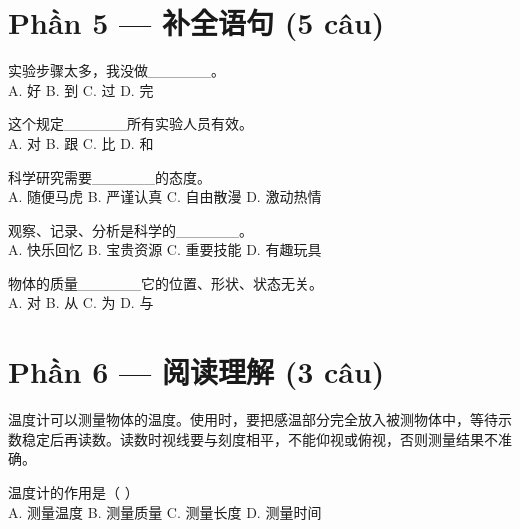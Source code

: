 \documentclass[11pt, a4paper]{article}
\begin{document}
\section*{Phần 5 — 补全语句 (5 câu)}

\begin{baitap}[13]
实验步骤太多，我没做\_\_\_\_\_\_。\\[4pt]
A. 好 \quad B. 到 \quad C. 过 \quad D. 完
\end{baitap}

\begin{baitap}[14]
这个规定\_\_\_\_\_\_所有实验人员有效。\\[4pt]
A. 对 \quad B. 跟 \quad C. 比 \quad D. 和
\end{baitap}

\begin{baitap}[15]
科学研究需要\_\_\_\_\_\_的态度。\\[4pt]
A. 随便马虎 \quad B. 严谨认真 \quad C. 自由散漫 \quad D. 激动热情
\end{baitap}

\begin{baitap}[16]
观察、记录、分析是科学的\_\_\_\_\_\_。\\[4pt]
A. 快乐回忆 \quad B. 宝贵资源 \quad C. 重要技能 \quad D. 有趣玩具
\end{baitap}

\begin{baitap}[17]
物体的质量\_\_\_\_\_\_它的位置、形状、状态无关。\\[4pt]
A. 对 \quad B. 从 \quad C. 为 \quad D. 与
\end{baitap}

\section*{Phần 6 — 阅读理解 (3 câu)}

温度计可以测量物体的温度。使用时，要把感温部分完全放入被测物体中，等待示数稳定后再读数。读数时视线要与刻度相平，不能仰视或俯视，否则测量结果不准确。

\begin{baitap}[18]
温度计的作用是（ ）\\[4pt]
A. 测量温度 \quad B. 测量质量 \quad C. 测量长度 \quad D. 测量时间
\end{baitap}
\end{document}
